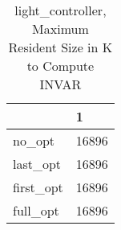 \begin{table}
\caption{light\_controller, Maximum Resident Size in K to Compute INVAR}
\label{light_controller_INVAR_size}
\begin{tabular}{ll}
\toprule
 & 1 \\
\midrule
no\_opt & 16896 \\
last\_opt & 16896 \\
first\_opt & 16896 \\
full\_opt & 16896 \\
\bottomrule
\end{tabular}
\end{table}
